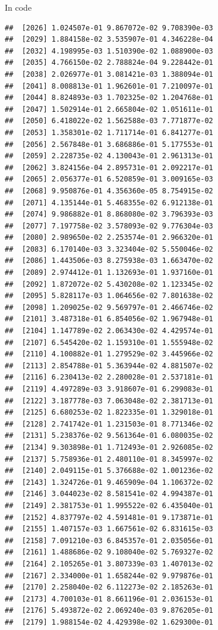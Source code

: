 \documentclass[ignorenonframetext,]{beamer}
\begin{document}
\begin{frame}[fragile]{In code}
\begin{verbatim}
##  [2026] 1.024507e-01 9.867072e-02 9.708390e-03
##  [2029] 1.884158e-02 3.535907e-01 4.346228e-04
##  [2032] 4.198995e-03 1.510390e-02 1.088900e-03
##  [2035] 4.766150e-02 2.788824e-04 9.228442e-01
##  [2038] 2.026977e-01 3.081421e-03 1.388094e-01
##  [2041] 8.008813e-01 1.962601e-01 7.210097e-01
##  [2044] 8.824893e-03 1.702325e-02 1.204768e-01
##  [2047] 1.502914e-01 2.665804e-02 1.051611e-01
##  [2050] 6.418022e-02 1.562588e-03 7.771877e-02
##  [2053] 1.358301e-02 1.711714e-01 6.841277e-01
##  [2056] 2.567848e-01 3.686886e-01 5.177553e-01
##  [2059] 2.228735e-02 4.130043e-01 2.961313e-01
##  [2062] 3.824156e-04 2.895731e-01 2.092217e-01
##  [2065] 2.056377e-01 6.520859e-01 3.009165e-03
##  [2068] 9.950876e-01 4.356360e-05 8.754915e-02
##  [2071] 4.135144e-01 5.468355e-02 6.912138e-01
##  [2074] 9.986882e-01 8.868080e-02 3.796393e-03
##  [2077] 7.197758e-02 3.578093e-02 9.776304e-03
##  [2080] 2.989650e-02 2.253574e-01 2.966320e-01
##  [2083] 6.170140e-03 3.323404e-02 5.550046e-02
##  [2086] 1.443506e-03 8.275938e-03 1.663470e-02
##  [2089] 2.974412e-01 1.132693e-01 1.937160e-01
##  [2092] 1.872072e-02 5.430208e-02 1.123345e-02
##  [2095] 5.828117e-03 1.064656e-02 7.801638e-02
##  [2098] 1.209025e-02 9.569797e-01 2.466746e-02
##  [2101] 3.487318e-01 6.854056e-02 1.967948e-01
##  [2104] 1.147789e-02 2.063430e-02 4.429574e-01
##  [2107] 6.545420e-02 1.159310e-01 1.555948e-02
##  [2110] 4.100882e-01 1.279529e-02 3.445966e-02
##  [2113] 2.854788e-01 5.363944e-02 4.881507e-02
##  [2116] 6.230413e-02 2.280028e-01 2.537181e-01
##  [2119] 4.497289e-03 3.918607e-01 6.299083e-01
##  [2122] 3.187778e-03 7.063048e-02 2.381713e-01
##  [2125] 6.680253e-02 1.822335e-01 1.329018e-01
##  [2128] 2.741742e-01 1.231503e-01 8.771346e-02
##  [2131] 5.238376e-02 9.561364e-01 6.080035e-02
##  [2134] 9.303898e-01 1.712493e-01 2.926085e-02
##  [2137] 5.758936e-01 2.480110e-01 8.345997e-02
##  [2140] 2.049115e-01 5.376688e-02 1.001236e-02
##  [2143] 1.324726e-01 9.465909e-04 1.106372e-02
##  [2146] 3.044023e-02 8.581541e-02 4.994387e-01
##  [2149] 2.381753e-01 1.995522e-02 6.435040e-01
##  [2152] 4.837797e-02 4.591481e-01 9.173871e-01
##  [2155] 1.407157e-03 1.667561e-02 6.831615e-03
##  [2158] 7.091210e-03 6.845357e-01 2.035056e-01
##  [2161] 1.488686e-02 9.108040e-02 5.769327e-02
##  [2164] 2.105265e-01 3.807339e-03 1.407013e-02
##  [2167] 2.334000e-01 1.658244e-02 9.979876e-01
##  [2170] 2.258040e-02 6.112273e-02 2.185263e-01
##  [2173] 4.700103e-01 8.661196e-01 2.036153e-01
##  [2176] 5.493872e-02 2.069240e-03 9.876205e-01
##  [2179] 1.988154e-02 4.429398e-02 1.629300e-01

\end{verbatim}
\end{frame}
\end{document}

